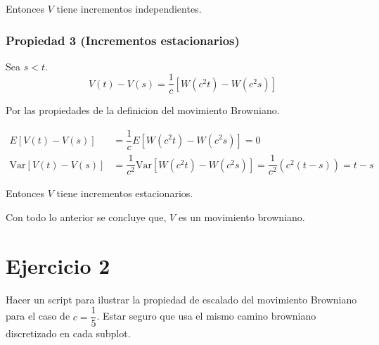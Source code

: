 \documentclass[
  letterpaper,
  DIV=11,
  numbers=noendperiod]{scrreprt}
\theoremstyle{plain}
\theoremstyle{definition}
\theoremstyle{remark}
\begin{document}
Entonces \(V\) tiene incrementos independientes.

\hypertarget{propiedad-3-incrementos-estacionarios}{%
\subsubsection{Propiedad 3 (Incrementos
estacionarios)}\label{propiedad-3-incrementos-estacionarios}}

Sea \(s<t\). \[
V(t)-V(s)=\dfrac{1}{c}\left[W(c^2 t) - W(c^2 s)\right]
\]

Por las propiedades de la definicion del movimiento Browniano.

\begin{align*}
E\left[V(t)-V(s)\right] & =\dfrac{1}{c}E\left[W(c^{2}t)-W(c^{2}s)\right]=0\\
\text{Var}\left[V(t)-V(s)\right] & =\dfrac{1}{c^{2}}\text{Var}\left[W(c^{2}t)-W(c^{2}s)\right]=\dfrac{1}{c^{2}}\left(c^{2}\left(t-s\right)\right)=t-s
\end{align*}

Entonces \(V\) tiene incrementos estacionarios.

Con todo lo anterior se concluye que, \(V\) es un movimiento browniano.

\hypertarget{ejercicio-2}{%
\section{Ejercicio 2}\label{ejercicio-2}}

Hacer un script para ilustrar la propiedad de escalado del movimiento
Browniano para el caso de \(c = \dfrac{1}{5}\). Estar seguro que usa el
mismo camino browniano discretizado en cada subplot.
\end{document}

